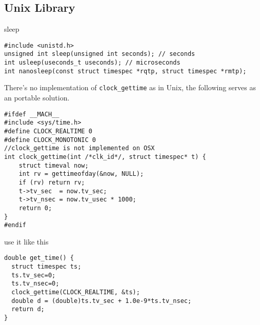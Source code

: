 \subsection{Unix Library}
sleep
\begin{lstlisting}
#include <unistd.h>
unsigned int sleep(unsigned int seconds); // seconds
int usleep(useconds_t useconds); // microseconds
int nanosleep(const struct timespec *rqtp, struct timespec *rmtp);
\end{lstlisting}

There's no implementation of \verb$clock_gettime$ as in Unix, the following serves as an portable solution.
\begin{lstlisting}
#ifdef __MACH__
#include <sys/time.h>
#define CLOCK_REALTIME 0
#define CLOCK_MONOTONIC 0
//clock_gettime is not implemented on OSX
int clock_gettime(int /*clk_id*/, struct timespec* t) {
    struct timeval now;
    int rv = gettimeofday(&now, NULL);
    if (rv) return rv;
    t->tv_sec  = now.tv_sec;
    t->tv_nsec = now.tv_usec * 1000;
    return 0;
}
#endif
\end{lstlisting}

use it like this
\begin{lstlisting}
double get_time() {
  struct timespec ts;
  ts.tv_sec=0;
  ts.tv_nsec=0;
  clock_gettime(CLOCK_REALTIME, &ts);
  double d = (double)ts.tv_sec + 1.0e-9*ts.tv_nsec;
  return d;
}
\end{lstlisting}

